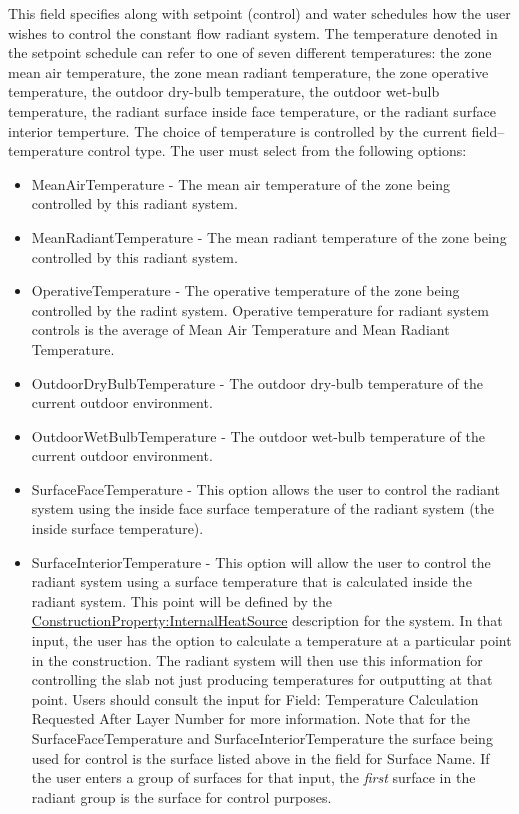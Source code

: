 This field specifies along with setpoint (control) and water schedules how the user wishes to control the constant flow radiant system. The temperature denoted in the setpoint schedule can refer to one of seven different temperatures: the zone mean air temperature, the zone mean radiant temperature, the zone operative temperature, the outdoor dry-bulb temperature, the outdoor wet-bulb temperature, the radiant surface inside face temperature, or the radiant surface interior temperture. The choice of temperature is controlled by the current field--temperature control type. The user must select from the following options:

\begin{itemize}
\item
  MeanAirTemperature - The mean air temperature of the zone being controlled by this radiant system.
\item
  MeanRadiantTemperature - The mean radiant temperature of the zone being controlled by this radiant system.
\item
  OperativeTemperature - The operative temperature of the zone being controlled by the radint system. Operative temperature for radiant system controls is the average of Mean Air Temperature and Mean Radiant Temperature.  
\item
  OutdoorDryBulbTemperature - The outdoor dry-bulb temperature of the current outdoor environment.
\item
  OutdoorWetBulbTemperature - The outdoor wet-bulb temperature of the current outdoor environment.
\item
  SurfaceFaceTemperature - This option allows the user to control the radiant system using the inside face surface temperature of the radiant system (the inside surface temperature).
\item SurfaceInteriorTemperature - This option will allow the user to control
      the radiant system using a surface temperature that is calculated inside
      the radiant system.  This point will be defined by the
      \hyperref[constructioninternalsource]{ConstructionProperty:InternalHeatSource}
      description for the system.  In that input, the user has the option to
      calculate a temperature at a particular point in the construction.  The
      radiant system will then use this information for controlling the slab
      not just producing temperatures for outputting at that point.  Users
      should consult the input for Field: Temperature Calculation Requested
      After Layer Number for more information.  Note that for the
      SurfaceFaceTemperature and SurfaceInteriorTemperature the surface being
      used for control is the surface listed above in the field for Surface
      Name.  If the user enters a group of surfaces for that input, the
      \emph{first} surface in the radiant group is the surface for control
      purposes.
\end{itemize}

